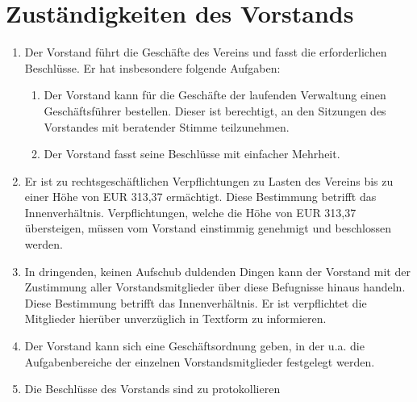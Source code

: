 \documentclass[a4paper,ngerman]{scrartcl}
\begin{document}
\section{Zuständigkeiten des Vorstands}
\begin{enumerate}
\item Der Vorstand führt die Geschäfte des Vereins und fasst die erforderlichen Beschlüsse. Er hat insbesondere folgende Aufgaben:
\begin{enumerate}
\item Der Vorstand kann für die Geschäfte der laufenden Verwaltung einen Geschäftsführer bestellen. Dieser ist berechtigt, an den Sitzungen des Vorstandes mit beratender Stimme teilzunehmen.
\item Der Vorstand fasst seine Beschlüsse mit einfacher Mehrheit.
\end{enumerate}
\item Er ist zu rechtsgeschäftlichen Verpflichtungen zu Lasten des Vereins bis zu einer Höhe von EUR 313,37 ermächtigt. Diese Bestimmung betrifft das Innenverhältnis. Verpflichtungen, welche die Höhe von EUR 313,37 übersteigen, müssen vom Vorstand einstimmig genehmigt und beschlossen werden.
\item In dringenden, keinen Aufschub duldenden Dingen kann der Vorstand mit der Zustimmung aller Vorstandsmitglieder über diese Befugnisse hinaus handeln. Diese Bestimmung betrifft das Innenverhältnis. Er ist verpflichtet die Mitglieder hierüber unverzüglich in Textform zu informieren.
\item Der Vorstand kann sich eine Geschäftsordnung geben, in der u.a. die Aufgabenbereiche der einzelnen Vorstandsmitglieder festgelegt werden.
\item Die Beschlüsse des Vorstands sind zu protokollieren
\end{enumerate}
\end{document}
